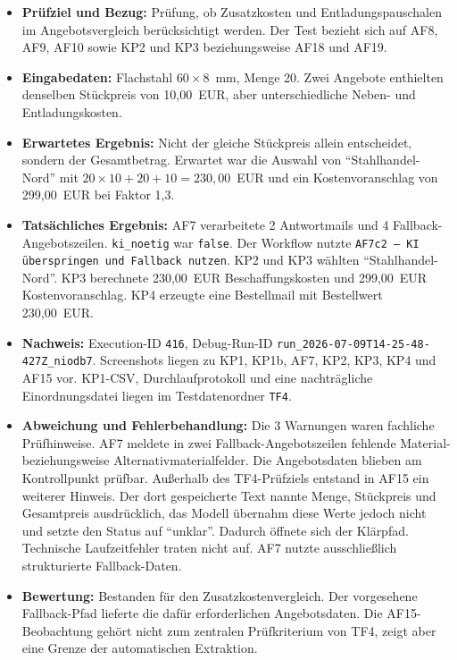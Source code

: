 \documentclass[a4paper,12pt]{article}
\begin{document}
\begin{itemize}
    \setlength{\itemsep}{3pt}
    \setlength{\parsep}{0pt}
    \item \textbf{Prüfziel und Bezug:} Prüfung, ob Zusatzkosten und Entladungspauschalen im Angebotsvergleich berücksichtigt werden. Der Test bezieht sich auf AF8, AF9, AF10 sowie KP2 und KP3 beziehungsweise AF18 und AF19.
    \item \textbf{Eingabedaten:} Flachstahl \(60 \times 8\)~mm, Menge 20. Zwei Angebote enthielten denselben Stückpreis von 10,00~EUR, aber unterschiedliche Neben- und Entladungskosten.
    \item \textbf{Erwartetes Ergebnis:} Nicht der gleiche Stückpreis allein entscheidet, sondern der Gesamtbetrag. Erwartet war die Auswahl von \enquote{Stahlhandel-Nord} mit \(20 \times 10 + 20 + 10 = 230{,}00\)~EUR und ein Kostenvoranschlag von 299,00~EUR bei Faktor 1,3.
    \item \textbf{Tatsächliches Ergebnis:} AF7 verarbeitete 2 Antwortmails und 4 Fallback-Angebotszeilen. \texttt{ki\_noetig} war \texttt{false}. Der Workflow nutzte \texttt{AF7c2 -- KI überspringen und Fallback nutzen}. KP2 und KP3 wählten \enquote{Stahlhandel-Nord}. KP3 berechnete 230,00~EUR Beschaffungskosten und 299,00~EUR Kostenvoranschlag. KP4 erzeugte eine Bestellmail mit Bestellwert 230,00~EUR.
    \item \textbf{Nachweis:} Execution-ID \texttt{416}, Debug-Run-ID \nolinkurl{run_2026-07-09T14-25-48-427Z_niodb7}. Screenshots liegen zu KP1, KP1b, AF7, KP2, KP3, KP4 und AF15 vor. KP1-CSV, Durchlaufprotokoll und eine nachträgliche Einordnungsdatei liegen im Testdatenordner \nolinkurl{TF4}.
    \item \textbf{Abweichung und Fehlerbehandlung:} Die 3 Warnungen waren fachliche Prüfhinweise. AF7 meldete in zwei Fallback-Angebotszeilen fehlende Material- beziehungsweise Alternativmaterialfelder. Die Angebotsdaten blieben am Kontrollpunkt prüfbar. Außerhalb des TF4-Prüfziels entstand in AF15 ein weiterer Hinweis. Der dort gespeicherte Text nannte Menge, Stückpreis und Gesamtpreis ausdrücklich, das Modell übernahm diese Werte jedoch nicht und setzte den Status auf \enquote{unklar}. Dadurch öffnete sich der Klärpfad. Technische Laufzeitfehler traten nicht auf. AF7 nutzte ausschließlich strukturierte Fallback-Daten.
    \item \textbf{Bewertung:} Bestanden für den Zusatzkostenvergleich. Der vorgesehene Fallback-Pfad lieferte die dafür erforderlichen Angebotsdaten. Die AF15-Beobachtung gehört nicht zum zentralen Prüfkriterium von TF4, zeigt aber eine Grenze der automatischen Extraktion.
\end{itemize}
\end{document}

